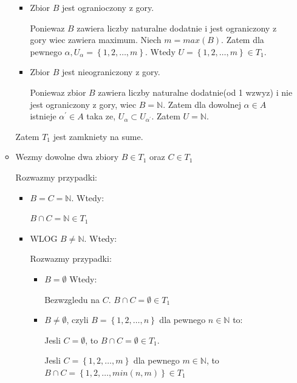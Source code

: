 \documentclass{article}
\begin{document}
\begin{enumerate}
\begin{itemize}
\begin{itemize}
                    \item Zbior $B$ jest ogranioczony z gory.

                        Poniewaz $B$ zawiera liczby naturalne dodatnie i jest ograniczony z gory wiec
                        zawiera maximum. Niech $m = max(B)$. Zatem dla pewnego $\alpha, U_{\alpha} = \left\{1,2,\dots,m\right\}$. Wtedy $U = \left\{1,2,\dots,m\right\} \in T_{1}$.
                    \item Zbior $B$ jest nieograniczony z gory.

                        Poniewaz zbior $B$ zawiera liczby naturalne dodatnie(od 1 wzwyz) i nie jest ograniczony z gory, wiec $B = \mathbb{N}$. Zatem dla dowolnej $\alpha \in A$ istnieje ${\alpha}^{\prime} \in A$ taka ze, $U_{\alpha} \subset U_{{\alpha}^{\prime}}$. Zatem $U = \mathbb{N}$.
                \end{itemize}%
                Zatem $T_{1}$ jest zamkniety na sume.
            \item Wezmy dowolne dwa zbiory $B \in T_{1}$ oraz $C \in T_{1}$

                Rozwazmy przypadki:
                \begin{itemize}%

                    \item $B = C = \mathbb{N}$. Wtedy:

                        $B\cap C = \mathbb{N} \in T_{1}$
                    \item WLOG $B \neq \mathbb{N}$. Wtedy:

                        Rozwazmy przypadki:
                        \begin{itemize}%

                            \item $B = \emptyset$ Wtedy:

                                Bezwzgledu na $C$. $B\cap C = \emptyset \in T_{1}$
                            \item $B \neq \emptyset$, czyli $B = \left\{1,2,\dots,n\right\}$ dla pewnego $n \in \mathbb{N}$ to:

                                Jesli $C = \emptyset$, to $B\cap C = \emptyset \in T_{1}$.

                                Jesli $C = \left\{1,2,\dots,m\right\}$ dla pewnego $m \in \mathbb{N}$, to $B\cap C = \left\{1,2,\dots,min(n,m)\right\} \in T_{1}$  


\end{itemize}
\end{itemize}
\end{itemize}
\end{enumerate}
\end{document}
